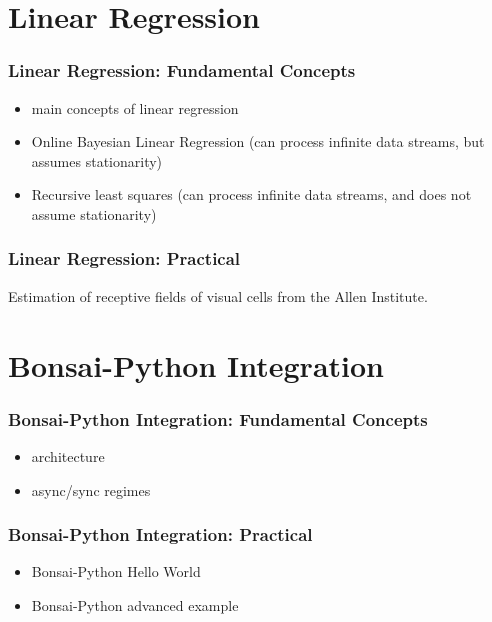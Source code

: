 \documentclass{beamer}
\begin{document}
\section{Linear Regression}

\begin{frame}
    \frametitle{Linear Regression: Fundamental Concepts}

    \begin{itemize}
        \item main concepts of linear regression
        \item Online Bayesian Linear Regression (can process infinite data streams, but assumes stationarity)
        \item Recursive least squares (can process infinite data streams, and
            does not assume stationarity)
    \end{itemize}

\end{frame}

\begin{frame}
    \frametitle{Linear Regression: Practical}

    Estimation of receptive fields of visual cells from the Allen Institute.

\end{frame}



\section{Bonsai-Python Integration}

\begin{frame}
    \frametitle{Bonsai-Python Integration: Fundamental Concepts}

    \begin{itemize}
        \item architecture
        \item async/sync regimes
    \end{itemize}

\end{frame}

\begin{frame}
    \frametitle{Bonsai-Python Integration: Practical}

    \begin{itemize}
        \item Bonsai-Python Hello World
        \item Bonsai-Python advanced example
    \end{itemize}

\end{frame}
\end{document}

